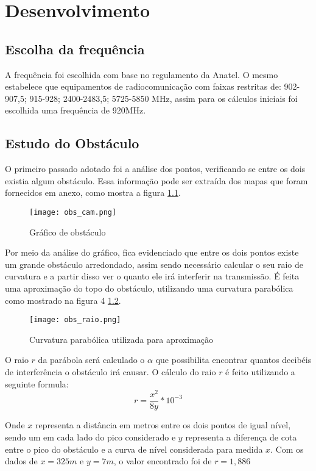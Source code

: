 \chapter{Desenvolvimento}\label{cap:CnptDsng}

\section{Escolha da frequência}\label{sec:esc_freq}
A frequência foi escolhida com base no regulamento da Anatel. O mesmo estabelece que equipamentos de radiocomunicação com faixas restritas de: 902-907,5; 915-928; 2400-2483,5; 5725-5850 MHz, assim para os cálculos iniciais foi escolhida uma frequência de 920MHz.

\section{Estudo do Obstáculo}\label{sec:est_obs}
O primeiro passado adotado foi a análise dos pontos, verificando se entre os dois existia algum obstáculo. Essa informação pode ser extraída dos mapas que foram fornecidos em anexo, como mostra a figura \ref{fig:obs_cam}.
\begin{figure}[h]
	\centering
	\texttt{[image: obs\_cam.png]}
	\caption{Gráfico de obstáculo}
	\label{fig:obs_cam}
\end{figure} 

Por meio da análise do gráfico, fica evidenciado que entre os dois pontos existe um grande obstáculo arredondado, assim sendo necessário calcular o seu raio de curvatura e a partir disso ver o quanto ele irá interferir na transmissão.
É feita uma aproximação do topo do obstáculo, utilizando uma curvatura parabólica como mostrado na figura 4 \ref{fig:obs_raio}.
\begin{figure}[h]
	\centering
	\texttt{[image: obs\_raio.png]}
	\label{fig:obs_raio}
	\caption{Curvatura parabólica utilizada para aproximação}
\end{figure} 

O raio $r$ da parábola será calculado o $\alpha$ que possibilita encontrar quantos decibéis de interferência o obstáculo irá causar. O cálculo do raio $r$ é feito utilizando a seguinte formula:
\begin{equation}
r = \dfrac{x^2}{8y}*10^{-3}
\end{equation}

Onde $x$ representa a distância em metros entre os dois pontos de igual nível, sendo um em cada lado do pico considerado e $y$ representa a diferença de cota entre o pico do obstáculo e a curva de nível considerada para  medida $x$. Com os dados de $x = 325m$ e $y = 7m$, o valor encontrado foi de $r = 1,886$

